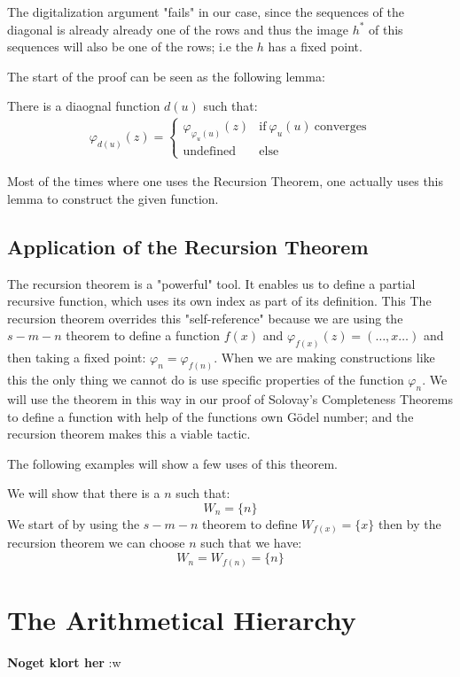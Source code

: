 \documentclass[../main.tex]{subfiles}
\begin{document}
The digitalization argument "fails" in our case, since the sequences of the
diagonal is already already one of the rows and thus the image $h^*$ of this
sequences will also be one of the rows; i.e the $h$ has a fixed point.

The start of the proof can be seen as the following lemma:
\begin{lem}
	There is a diaognal function $d(u)$ such that:
	\begin{align}\varphi_{d(u)}(z)=\begin{cases}
		\varphi_{\varphi_u(u)}(z)& \text{if}\ \varphi_u(u)\
		\text{converges}\\
		\text{undefined} & \text{else}
	\end{cases}
	\end{align}
\end{lem}

Most of the times where one uses the Recursion Theorem, one actually uses this
lemma to construct the given function.

\subsection{Application of the Recursion Theorem}
The recursion theorem is a "powerful" tool. It enables us to define a partial
recursive function, which uses its own index as part of its definition. This
The recursion theorem overrides this "self-reference" because we are using the
$s-m-n$ theorem to define a function $f(x)$ and
$\varphi_{f(x)}(z)=(\ldots,x\ldots)$ and then taking a fixed point:
$\varphi_n=\varphi_{f(n)}$.  When we are making constructions like this the
only thing we cannot do is use specific properties of the function $\varphi_n$.
We will use the theorem in this way in our proof of Solovay's Completeness
Theorems to define a function with help of the functions own Gödel number; and
the recursion theorem makes this a viable tactic.

The
following examples will show a few uses of this theorem.
\begin{exmp}
	We will show that there is a $n$ such that:
	$$W_n=\{n\}$$
	We start of by using the $s-m-n$ theorem to define $W_{f(x)}=\{x\}$
	then by the recursion theorem we can choose $n$ such that we have:
	$$W_n=W_{f(n)}=\{n\}$$
\end{exmp}
\section{The Arithmetical Hierarchy}
\textbf{Noget klort her} :w
\end{document}
